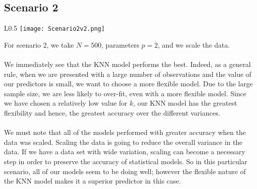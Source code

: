 \documentclass[11pt, oneside]{article}
\begin{document}
\subsection*{Scenario 2}
\begin{wrapfigure}[]{L}{0.5\textwidth}
\vspace{-0.55cm}
\texttt{[image: Scenario2v2.png]}
\vspace{-.25cm}
\end{wrapfigure}
For scenario 2, we take $N=500$, parameters $p=2$, and we scale the data.\\
\\
We immediately see that the KNN model performs the best. Indeed, as a general rule, when we are presented with a large number of observations and the value of our predictors is small, we want to choose a more flexible model. Due to the large sample size, we are less likely to over-fit, even with a more flexible model. Since we have chosen a relatively low value for $k$, our KNN model has the greatest flexibility and hence, the greatest accuracy over the different variances.\\
\\
We must note that all of the models performed with greater accuracy when the data was scaled. Scaling the data is going to reduce the overall variance in the data. If we have a data set with wide variation, scaling can become a necessary step in order to preserve the accuracy of statistical models. So in this particular scenario, all of our models seem to be doing well; however the flexible nature of the KNN model makes it a superior predictor in this case.




\end{document}
